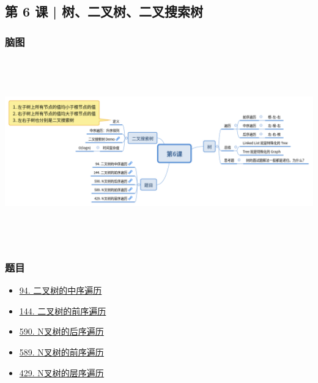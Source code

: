 \subsection{第 6 课 | 树、二叉树、二叉搜索树}

\subsubsection{脑图}

\includegraphics[width=170mm,height=80mm]{images/camp/第6课.png}

\subsubsection{题目}

\begin{itemize}
  \item \hyperref[leetcode:94]{94. 二叉树的中序遍历}
  \item \hyperref[leetcode:144]{144. 二叉树的前序遍历}
  \item \hyperref[leetcode:590]{590. N叉树的后序遍历}
  \item \hyperref[leetcode:589]{589. N叉树的前序遍历}
  \item \hyperref[leetcode:429]{429. N叉树的层序遍历}
\end{itemize}
